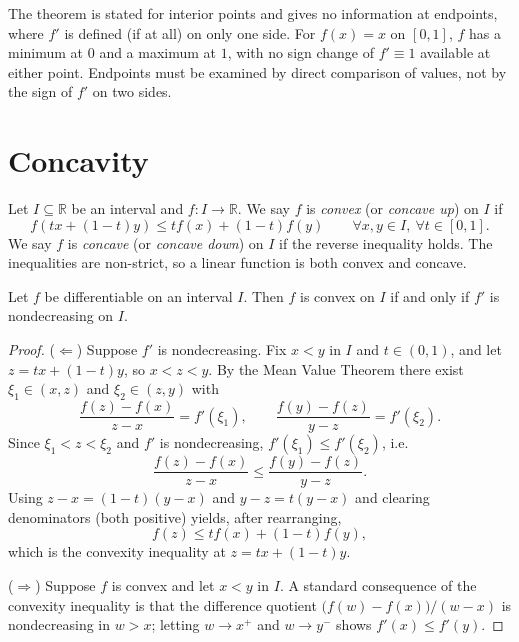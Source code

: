 \documentclass{essay}
\begin{document}
\begin{remark}[Endpoints]
  The theorem is stated for interior points and gives no information at
  endpoints, where \(f'\) is defined (if at all) on only one side. For
  \(f(x)=x\) on \([0,1]\), \(f\) has a minimum at \(0\) and a maximum at
  \(1\), with no sign change of \(f'\equiv1\) available at either point.
  Endpoints must be examined by direct comparison of values, not by the sign
  of \(f'\) on two sides.
\end{remark}

\section{Concavity}
\label{sec:concavity}

\begin{definition}
  Let \(I\subseteq\mathbb{R}\) be an interval and \(f:I\to\mathbb{R}\). We say
  \(f\) is \emph{convex} (or \emph{concave up}) on \(I\) if
  \[ f(tx+(1-t)y)\leq t f(x)+(1-t)f(y) \qquad \forall x,y\in I,\ \forall t\in[0,1]. \]
  We say \(f\) is \emph{concave} (or \emph{concave down}) on \(I\) if the
  reverse inequality holds. The inequalities are non-strict, so a linear
  function is both convex and concave.
\end{definition}

\begin{proposition}
  Let \(f\) be differentiable on an interval \(I\). Then \(f\) is convex on
  \(I\) if and only if \(f'\) is nondecreasing on \(I\).
\end{proposition}

\begin{proof}
  (\(\Leftarrow\)) Suppose \(f'\) is nondecreasing. Fix \(x<y\) in \(I\) and
  \(t\in(0,1)\), and let \(z=tx+(1-t)y\), so \(x<z<y\). By the Mean Value
  Theorem there exist \(\xi_{1}\in(x,z)\) and \(\xi_{2}\in(z,y)\) with
  \[ \frac{f(z)-f(x)}{z-x}=f'(\xi_{1}), \qquad \frac{f(y)-f(z)}{y-z}=f'(\xi_{2}). \]
  Since \(\xi_{1}<z<\xi_{2}\) and \(f'\) is nondecreasing, \(f'(\xi_{1})\leq
  f'(\xi_{2})\), i.e.
  \[ \frac{f(z)-f(x)}{z-x}\leq\frac{f(y)-f(z)}{y-z}. \]
  Using \(z-x=(1-t)(y-x)\) and \(y-z=t(y-x)\) and clearing denominators
  (both positive) yields, after rearranging,
  \[ f(z)\leq t f(x)+(1-t)f(y), \]
  which is the convexity inequality at \(z=tx+(1-t)y\).

  (\(\Rightarrow\)) Suppose \(f\) is convex and let \(x<y\) in \(I\). A
  standard consequence of the convexity inequality is that the difference
  quotient \(\bigl(f(w)-f(x)\bigr)/(w-x)\) is nondecreasing in \(w>x\); letting
  \(w\to x^+\) and \(w\to y^-\) shows \(f'(x)\leq f'(y)\).
\end{proof}
\end{document}
